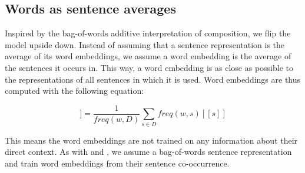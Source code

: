 % 
% 

\subsection{Words as sentence averages}

Inspired by the bag-of-words additive interpretation of composition, we flip the model upside down.
Instead of assuming that a sentence representation is the average of its word embeddings, we assume a word embedding is the average of the sentences it occurs in.
This way, a word embedding is as close as possible to the representations of all sentences in which it is used.
Word embeddings are thus computed with the following equation:

\begin{equation*}
[\![ w ]\!] =\frac{1}{freq(w,D)}\sum_{s\in D}freq(w,s) [\![ s ]\!]
\end{equation*}

This means the word embeddings are not trained on any information about their direct context.
As with \cite{hermann2013multilingual} and \cite{SarathChandar2014autoencoder}, we assume a bag-of-words sentence representation and train word embeddings from their sentence co-occurrence.
